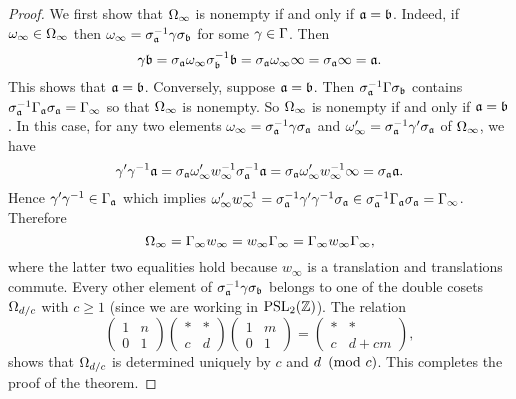       \begin{proof}
        We first show that $\Omega_{\infty}$ is nonempty if and only if $\mathfrak{a} = \mathfrak{b}$. Indeed, if $\omega_{\infty} \in \Omega_{\infty}$ then $\omega_{\infty} = \sigma_{\mathfrak{a}}^{-1}\gamma\sigma_{\mathfrak{b}}$ for some $\gamma \in \Gamma$. Then
        \[
          \gamma\mathfrak{b} = \sigma_{\mathfrak{a}}\omega_{\infty}\sigma_{\mathfrak{b}}^{-1}\mathfrak{b} = \sigma_{\mathfrak{a}}\omega_{\infty}\infty = \sigma_{\mathfrak{a}}\infty = \mathfrak{a}.
        \]
        This shows that $\mathfrak{a} = \mathfrak{b}$. Conversely, suppose $\mathfrak{a} = \mathfrak{b}$. Then $\sigma_{\mathfrak{a}}^{-1}\Gamma\sigma_{\mathfrak{b}}$ contains $\sigma_{\mathfrak{a}}^{-1}\Gamma_{\mathfrak{a}}\sigma_{\mathfrak{a}} = \Gamma_{\infty}$ so that $\Omega_{\infty}$ is nonempty. So $\Omega_{\infty}$ is nonempty if and only if $\mathfrak{a} = \mathfrak{b}$. In this case, for any two elements $\omega_{\infty} = \sigma_{\mathfrak{a}}^{-1}\gamma\sigma_{\mathfrak{a}}$ and $\omega'_{\infty} = \sigma_{\mathfrak{a}}^{-1}\gamma'\sigma_{\mathfrak{a}}$ of $\Omega_{\infty}$, we have
        \[
          \gamma'\gamma^{-1}\mathfrak{a} = \sigma_{\mathfrak{a}}\omega'_{\infty}w_{\infty}^{-1}\sigma_{\mathfrak{a}}^{-1}\mathfrak{a} = \sigma_{\mathfrak{a}}\omega'_{\infty}w_{\infty}^{-1}\infty = \sigma_{\mathfrak{a}}\mathfrak{a}.
        \]
        Hence $\gamma'\gamma^{-1} \in \Gamma_{\mathfrak{a}}$ which implies $\omega'_{\infty}w_{\infty}^{-1} = \sigma_{\mathfrak{a}}^{-1}\gamma'\gamma^{-1}\sigma_{\mathfrak{a}} \in \sigma_{\mathfrak{a}}^{-1}\Gamma_{\mathfrak{a}}\sigma_{\mathfrak{a}} = \Gamma_{\infty}$. Therefore
        \[
          \Omega_{\infty} = \Gamma_{\infty}w_{\infty} = w_{\infty}\Gamma_{\infty} = \Gamma_{\infty}w_{\infty}\Gamma_{\infty},
        \]
        where the latter two equalities hold because $w_{\infty}$ is a translation and translations commute. Every other element of $\sigma_{\mathfrak{a}}^{-1}\gamma\sigma_{\mathfrak{b}}$ belongs to one of the double cosets $\Omega_{d/c}$ with $c \ge 1$ (since we are working in $\mathrm{PSL}_{2}(\mathbb{Z})$). The relation
        \[
          \begin{pmatrix} 1 & n \\ 0 & 1 \end{pmatrix}\begin{pmatrix} \ast & \ast \\ c & d \end{pmatrix}\begin{pmatrix} 1 & m \\ 0 & 1 \end{pmatrix} = \begin{pmatrix} \ast & \ast \\ c & d+cm \end{pmatrix},
        \]
        shows that $\Omega_{d/c}$ is determined uniquely by $c$ and $d \ \left(\text{mod }c\right)$. This completes the proof of the theorem.
      \end{proof}

